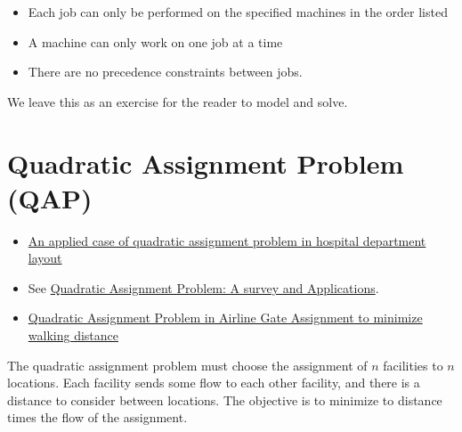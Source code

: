 \begin{itemize}
    \item Each job can only be performed on the specified machines in the order listed
    \item A machine can only work on one job at a time
    \item There are no precedence constraints between jobs.
\end{itemize}
%

We leave this as an exercise for the reader to model and solve.

\section{Quadratic Assignment Problem (QAP)}
\begin{resource}{}{}
\begin{itemize}
\item \href{https://ieeexplore-ieee-org.ezproxy.lib.vt.edu/stamp/stamp.jsp?tp=&arnumber=7170278}{An applied case of quadratic assignment problem in hospital department layout}
\item See \href{https://www.semanticscholar.org/paper/Quadratic-Assignment-Problem%3A-A-survey-and-Shawky-Metwally/247b45613d6d3b6961fdad44f9e7fefb70fd3e82}{Quadratic Assignment Problem: A survey and Applications}.
\item \href{https://vtechworks.lib.vt.edu/server/api/core/bitstreams/06b13a4f-d1a9-452c-957f-b0bdd1619c76/content}{Quadratic Assignment Problem in Airline Gate Assignment to minimize walking distance}
\end{itemize}
\end{resource}
The quadratic assignment problem must choose the assignment of $n$ facilities to $n$ locations.  Each facility sends some flow to each other facility, and there is a distance to consider between locations.   
The objective is to minimize to distance times the flow of the assignment.

